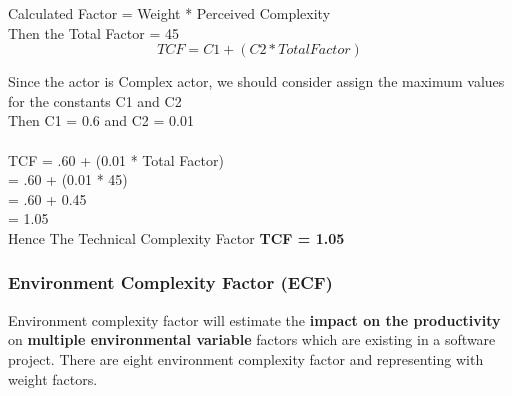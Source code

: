 \documentclass[a4paper, 11pt]{article}
\begin{document}
Calculated Factor = Weight * Perceived Complexity\\

Then the Total Factor  =  45\\
\begin{equation}
TCF = C1 + (C2 * Total Factor)
\end{equation}


Since the actor is Complex actor, we should consider assign the maximum values for the constants C1 and C2\\

Then C1 = 0.6 and C2 = 0.01\\ \\
TCF = .60 + (0.01 * Total Factor)\\
        = .60 + (0.01 * 45)\\
        = .60 + 0.45\\
        = 1.05\\
Hence The Technical Complexity Factor \textbf{TCF  = 1.05}\

\subsubsection{Environment Complexity Factor (ECF)}
Environment complexity factor will estimate the \textbf{impact on the productivity} on \textbf{multiple environmental variable} factors which are existing in a software project.\cite{3} There are eight environment complexity factor and representing with weight factors. 
\end{document}
